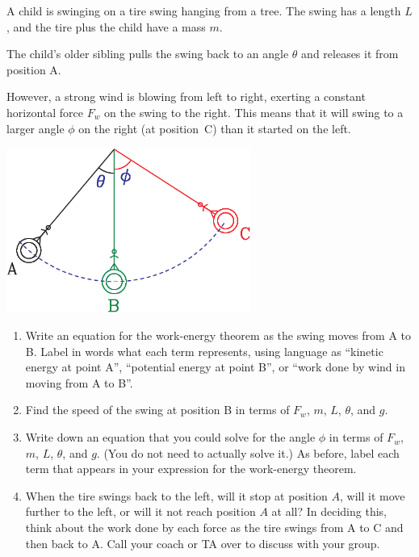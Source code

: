 \documentclass[12pt]{article}
\begin{document}
 
 A child is swinging on a tire swing hanging from a tree. The swing has a length $L$, and the
 	tire plus the child have a mass $m$.
 	
 	The child's older sibling pulls the swing back to an angle $\theta$ and releases it from position A.
 	
 	However, a strong wind is blowing from left to right, exerting a constant horizontal force $F_w$ on the swing to the right. This means that it will swing to a larger angle $\phi$ on the right (at position~C) than it started on the left.




 	\begin{center}
 		\includegraphics[width=0.6\textwidth]{swing-crop.pdf}
 	\end{center}

 
   \begin{enumerate}
 	\item Write an equation for the work-energy theorem as the swing moves from A to B. Label in words what each term represents, using language as ``kinetic energy at point A'', ``potential energy at point B'', or ``work done by wind in moving from A to B''.
 	
 	\vspace{3in}
 	
 	\newpage
 	\item Find the speed of the swing at position B in terms of $F_w$, $m$, $L$, $\theta$, and $g$.
 	
 	\vspace{2in}
 
 	\item Write down an equation that you could solve for the angle $\phi$ in terms of $F_w$, $m$, $L$, $\theta$, and $g$. (You do not need to actually solve it.) As before, label each term that appears in your expression for the work-energy theorem.
 	
 	
 	\vspace{4in}
 	
 	\item When the tire swings back to the left, will it stop at position $A$, will it move further to the left, or will it not reach position $A$ at all? In deciding this, think about the work done by each force as the tire swings from A to C and then back to A. Call your coach or TA over to discuss with your group.
 \end{enumerate}
 
\end{document}
